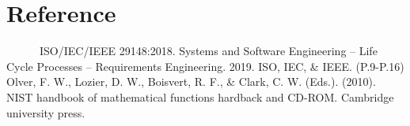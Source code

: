 \documentclass{article}
\begin{document}
 \section{Reference}
 
\ \ \ \ \ \ ISO/IEC/IEEE 29148:2018. Systems and Software Engineering -- Life Cycle Processes -- Requirements Engineering. 2019. ISO, IEC, & IEEE. (P.9-P.16)
\\

Olver, F. W., Lozier, D. W., Boisvert, R. F., & Clark, C. W. (Eds.). (2010). NIST handbook of mathematical functions hardback and CD-ROM. Cambridge university press.
\end{document}
